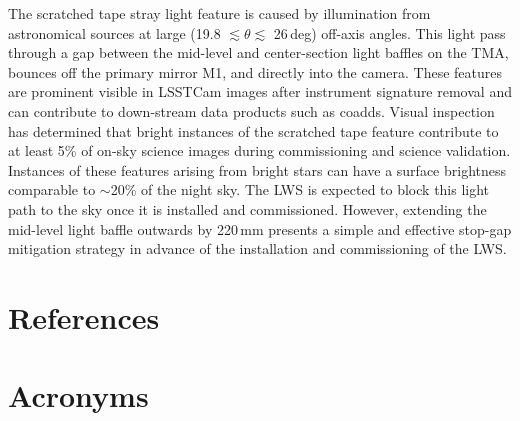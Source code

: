 \documentclass[SE,authoryear,toc]{lsstdoc}
\begin{document}
The scratched tape stray light feature is caused by illumination from astronomical sources at large (19.8 $\lesssim \theta \lesssim$ 26\,deg) off-axis angles. This light pass through a gap between the mid-level and center-section light baffles on the TMA, bounces off the primary mirror M1, and directly into the camera. These features are prominent visible in LSSTCam images after instrument signature removal and can contribute to down-stream data products such as coadds. Visual inspection has determined that bright instances of the scratched tape feature contribute to at least 5\% of on-sky science images during commissioning and science validation. Instances of these features arising from bright stars can have a surface brightness comparable to $\sim$20\% of the night sky. The LWS is expected to block this light path to the sky once it is installed and commissioned. However, extending the mid-level light baffle outwards by 220\,mm presents a simple and effective stop-gap mitigation strategy in advance of the installation and commissioning of the LWS.

\appendix
\section{References} \label{sec:bib}
\renewcommand{\refname}{} %


\section{Acronyms} \label{sec:acronyms}

\end{document}
